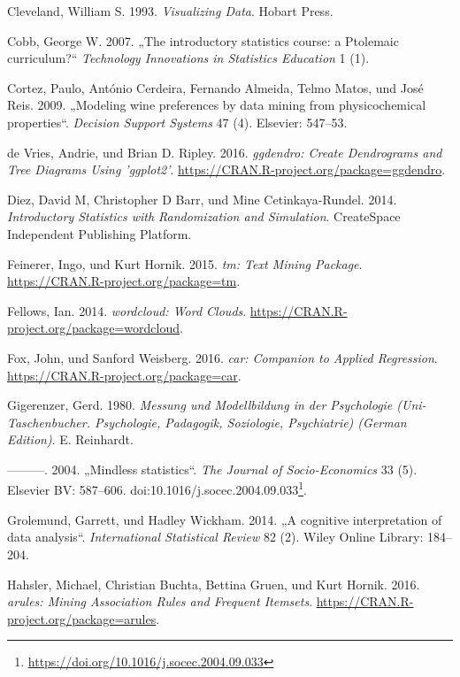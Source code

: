 \documentclass[12pt,ngerman,]{book}
\let\rmarkdownfootnote\footnote%
\def\footnote{\protect\rmarkdownfootnote}
\renewcommand{\href}[2]{#2\footnote{\url{#1}}}
\begin{document}
\hypertarget{ref-Cleveland}{}
Cleveland, William S. 1993. \emph{Visualizing Data}. Hobart Press.

\hypertarget{ref-cobb2007introductory}{}
Cobb, George W. 2007. „The introductory statistics course: a Ptolemaic
curriculum?`` \emph{Technology Innovations in Statistics Education} 1
(1).

\hypertarget{ref-cortez2009modeling}{}
Cortez, Paulo, António Cerdeira, Fernando Almeida, Telmo Matos, und José
Reis. 2009. „Modeling wine preferences by data mining from
physicochemical properties``. \emph{Decision Support Systems} 47 (4).
Elsevier: 547--53.

\hypertarget{ref-R-ggdendro}{}
de Vries, Andrie, und Brian D. Ripley. 2016. \emph{ggdendro: Create
Dendrograms and Tree Diagrams Using 'ggplot2'}.
\url{https://CRAN.R-project.org/package=ggdendro}.

\hypertarget{ref-introstats}{}
Diez, David M, Christopher D Barr, und Mine Cetinkaya-Rundel. 2014.
\emph{Introductory Statistics with Randomization and Simulation}.
CreateSpace Independent Publishing Platform.

\hypertarget{ref-R-tm}{}
Feinerer, Ingo, und Kurt Hornik. 2015. \emph{tm: Text Mining Package}.
\url{https://CRAN.R-project.org/package=tm}.

\hypertarget{ref-R-wordcloud}{}
Fellows, Ian. 2014. \emph{wordcloud: Word Clouds}.
\url{https://CRAN.R-project.org/package=wordcloud}.

\hypertarget{ref-R-car}{}
Fox, John, und Sanford Weisberg. 2016. \emph{car: Companion to Applied
Regression}. \url{https://CRAN.R-project.org/package=car}.

\hypertarget{ref-gigerenzer1980}{}
Gigerenzer, Gerd. 1980. \emph{Messung und Modellbildung in der
Psychologie (Uni-Taschenbucher. Psychologie, Padagogik, Soziologie,
Psychiatrie) (German Edition)}. E. Reinhardt.

\hypertarget{ref-Gigerenzer2004}{}
---------. 2004. „Mindless statistics``. \emph{The Journal of
Socio-Economics} 33 (5). Elsevier BV: 587--606.
doi:\href{https://doi.org/10.1016/j.socec.2004.09.033}{10.1016/j.socec.2004.09.033}.

\hypertarget{ref-grolemund2014cognitive}{}
Grolemund, Garrett, und Hadley Wickham. 2014. „A cognitive
interpretation of data analysis``. \emph{International Statistical
Review} 82 (2). Wiley Online Library: 184--204.

\hypertarget{ref-R-arules}{}
Hahsler, Michael, Christian Buchta, Bettina Gruen, und Kurt Hornik.
2016. \emph{arules: Mining Association Rules and Frequent Itemsets}.
\url{https://CRAN.R-project.org/package=arules}.
\end{document}

